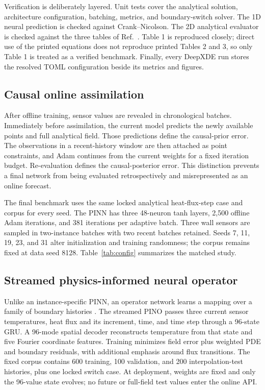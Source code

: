 \documentclass[journal]{new-aiaa}
\begin{document}
Verification is deliberately layered. Unit tests cover the analytical solution, architecture configuration, batching, metrics, and boundary-switch solver. The 1D neural prediction is checked against Crank--Nicolson. The 2D analytical evaluator is checked against the three tables of Ref.~\cite{hsu2023}. Table 1 is reproduced closely; direct use of the printed equations does not reproduce printed Tables 2 and 3, so only Table 1 is treated as a verified benchmark. Finally, every DeepXDE run stores the resolved TOML configuration beside its metrics and figures.

\subsection{Causal online assimilation}
After offline training, sensor values are revealed in chronological batches. Immediately before assimilation, the current model predicts the newly available points and full analytical field. Those predictions define the causal-prior error. The observations in a recent-history window are then attached as point constraints, and Adam continues from the current weights for a fixed iteration budget. Re-evaluation defines the causal-posterior error. This distinction prevents a final network from being evaluated retrospectively and misrepresented as an online forecast.

The final benchmark uses the same locked analytical heat-flux-step case and corpus for every seed. The PINN has three 48-neuron tanh layers, 2,500 offline Adam iterations, and 381 iterations per adaptive batch. Three wall sensors are sampled in two-instance batches with two recent batches retained. Seeds 7, 11, 19, 23, and 31 alter initialization and training randomness; the corpus remains fixed at data seed 8128. Table~\ref{tab:config} summarizes the matched study.

\subsection{Streamed physics-informed neural operator}
Unlike an instance-specific PINN, an operator network learns a mapping over a family of boundary histories \cite{li2021pino}. The streamed PINO passes three current sensor temperatures, heat flux and its increment, time, and time step through a 96-state GRU. A 96-mode spatial decoder reconstructs temperature from that state and five Fourier coordinate features. Training minimizes field error plus weighted PDE and boundary residuals, with additional emphasis around flux transitions. The fixed corpus contains 600 training, 100 validation, and 200 interpolation-test histories, plus one locked switch case. At deployment, weights are fixed and only the 96-value state evolves; no future or full-field test values enter the online API.
\end{document}
